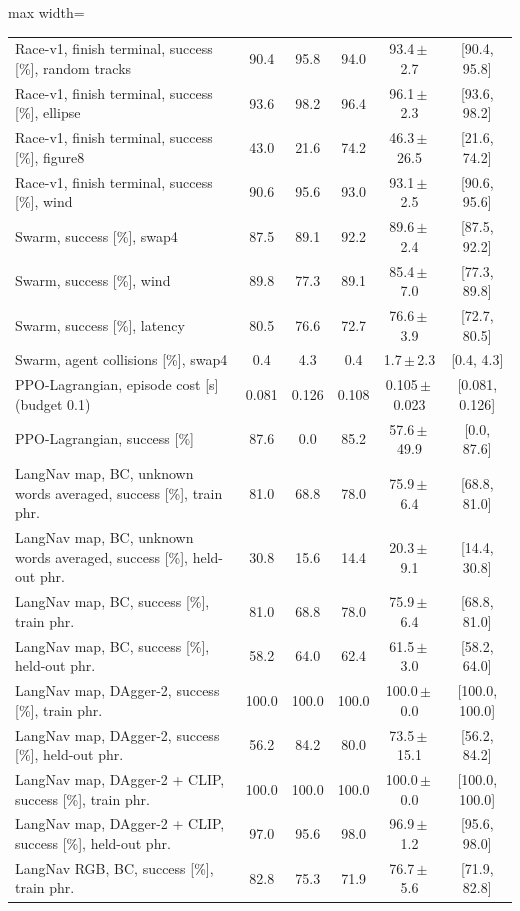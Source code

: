 \begin{table}[!htbp]
\begin{adjustbox}{max width=\linewidth}
\begin{tabular}{lccccc}
Race-v1, finish terminal, success [\%], random tracks & 90.4 & 95.8 & 94.0 & 93.4\,$\pm$\,2.7 & [90.4, 95.8]\\
Race-v1, finish terminal, success [\%], ellipse & 93.6 & 98.2 & 96.4 & 96.1\,$\pm$\,2.3 & [93.6, 98.2]\\
Race-v1, finish terminal, success [\%], figure8 & 43.0 & 21.6 & 74.2 & 46.3\,$\pm$\,26.5 & [21.6, 74.2]\\
Race-v1, finish terminal, success [\%], wind & 90.6 & 95.6 & 93.0 & 93.1\,$\pm$\,2.5 & [90.6, 95.6]\\
Swarm, success [\%], swap4 & 87.5 & 89.1 & 92.2 & 89.6\,$\pm$\,2.4 & [87.5, 92.2]\\
Swarm, success [\%], wind & 89.8 & 77.3 & 89.1 & 85.4\,$\pm$\,7.0 & [77.3, 89.8]\\
Swarm, success [\%], latency & 80.5 & 76.6 & 72.7 & 76.6\,$\pm$\,3.9 & [72.7, 80.5]\\
Swarm, agent collisions [\%], swap4 & 0.4 & 4.3 & 0.4 & 1.7\,$\pm$\,2.3 & [0.4, 4.3]\\
PPO-Lagrangian, episode cost [s] (budget 0.1) & 0.081 & 0.126 & 0.108 & 0.105\,$\pm$\,0.023 & [0.081, 0.126]\\
PPO-Lagrangian, success [\%] & 87.6 & 0.0 & 85.2 & 57.6\,$\pm$\,49.9 & [0.0, 87.6]\\
LangNav map, BC, unknown words averaged, success [\%], train phr. & 81.0 & 68.8 & 78.0 & 75.9\,$\pm$\,6.4 & [68.8, 81.0]\\
LangNav map, BC, unknown words averaged, success [\%], held-out phr. & 30.8 & 15.6 & 14.4 & 20.3\,$\pm$\,9.1 & [14.4, 30.8]\\
LangNav map, BC, success [\%], train phr. & 81.0 & 68.8 & 78.0 & 75.9\,$\pm$\,6.4 & [68.8, 81.0]\\
LangNav map, BC, success [\%], held-out phr. & 58.2 & 64.0 & 62.4 & 61.5\,$\pm$\,3.0 & [58.2, 64.0]\\
LangNav map, DAgger-2, success [\%], train phr. & 100.0 & 100.0 & 100.0 & 100.0\,$\pm$\,0.0 & [100.0, 100.0]\\
LangNav map, DAgger-2, success [\%], held-out phr. & 56.2 & 84.2 & 80.0 & 73.5\,$\pm$\,15.1 & [56.2, 84.2]\\
LangNav map, DAgger-2 + CLIP, success [\%], train phr. & 100.0 & 100.0 & 100.0 & 100.0\,$\pm$\,0.0 & [100.0, 100.0]\\
LangNav map, DAgger-2 + CLIP, success [\%], held-out phr. & 97.0 & 95.6 & 98.0 & 96.9\,$\pm$\,1.2 & [95.6, 98.0]\\
LangNav RGB, BC, success [\%], train phr. & 82.8 & 75.3 & 71.9 & 76.7\,$\pm$\,5.6 & [71.9, 82.8]\\

\end{tabular}
\end{adjustbox}
\end{table}
